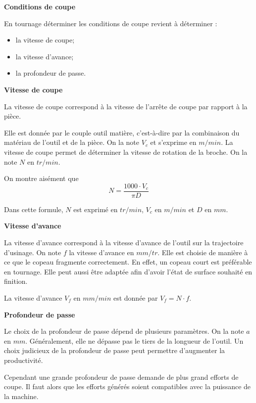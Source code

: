 \documentclass[11pt,oneside]{article}
\begin{document}
\begin{defi}
\textbf{Conditions de coupe}

En tournage déterminer les conditions de coupe revient à déterminer : 
\begin{itemize}
\item la vitesse de coupe;
\item la vitesse d'avance; 
\item la profondeur de passe. 
\end{itemize}
\end{defi}

\begin{defi}
\textbf{Vitesse de coupe}

La vitesse de coupe correspond à la vitesse de l'arrête de coupe par rapport à la pièce. 

Elle est donnée par le couple outil matière, c'est-à-dire par la combinaison du matériau de l'outil et de la pièce. On la note $V_c$ et s'exprime en $m/min$. La vitesse de coupe permet de déterminer la vitesse de rotation de la broche. On la note $N$ en $tr/min$. 

On montre aisément que 
$$
N= \dfrac{1000\cdot V_c}{\pi D}
$$

Dans cette formule, $N$ est exprimé en $tr/min$, $V_c$ en $m/min$ et $D$ en $mm$.
\end{defi}


\begin{defi}
\textbf{Vitesse d'avance}

La vitesse d'avance correspond à la vitesse d'avance de l'outil sur la trajectoire d'usinage. On note $f$ la vitesse d'avance en $mm/tr$. Elle est choisie de manière à ce que le copeau fragmente correctement. En effet, un copeau court est préférable en tournage. Elle peut aussi être adaptée afin d'avoir l'état de surface souhaité en finition. 

La vitesse d'avance $V_f$ en $mm/min$ est donnée par $V_f = N\cdot f$.
\end{defi}


\begin{defi}
\textbf{Profondeur de passe}

Le choix de la profondeur de passe dépend de plusieurs paramètres. On la note $a$ en $mm$. Généralement, elle ne dépasse pas le tiers de la longueur de l'outil. 
Un choix judicieux de la profondeur de passe peut permettre d'augmenter la productivité. 

Cependant une grande profondeur de passe demande de plus grand efforts de coupe. Il faut alors que les efforts générés soient compatibles avec la puissance de la machine.
	
\end{defi}
\end{document}
